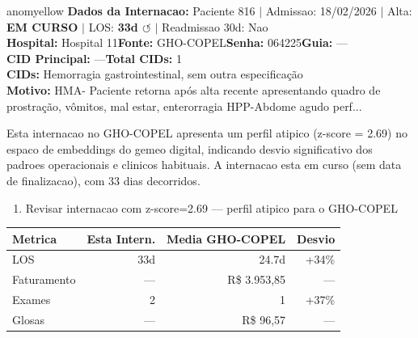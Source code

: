 \documentclass[a4paper,10pt]{article}
\begin{document}
\begin{anomalycard}[Internacao 698 | GHO-COPEL | MODERADO (z=2.69)]{anomyellow}
\textbf{Dados da Internacao:} Paciente 816 $\mid$ Admissao: 18/02/2026 $\mid$ Alta: \textcolor{anomorange}{\textbf{EM CURSO}} $\mid$ LOS: \textbf{33d \textcolor{anomorange}{$\circlearrowleft$}} $\mid$ Readmissao 30d: Nao\\
\textbf{Hospital:} Hospital 11\quad\textbf{Fonte:} GHO-COPEL\quad\textbf{Senha:} 064225\quad\textbf{Guia:} ---\\
\textbf{CID Principal:} {\small ---}\quad\textbf{Total CIDs:} 1\\

\textbf{CIDs:} {\scriptsize Hemorragia gastrointestinal, sem outra especificação}\\

\textbf{Motivo:} {\scriptsize HMA- Paciente retorna após alta recente apresentando quadro de prostração, vômitos, mal estar, enterorragia HPP-Abdome agudo perf...}\\

\vspace{2pt}\begin{tcolorbox}[colback=severityred!20,colframe=anomyellow,title={\textbf{Interpretacao de Negocio}},fonttitle=\bfseries\small,left=4pt,right=4pt,top=3pt,bottom=3pt]
{\small Esta internacao no GHO-COPEL apresenta um perfil atipico (z-score = 2.69) no espaco de embeddings do gemeo digital, indicando desvio significativo dos padroes operacionais e clinicos habituais. A internacao esta em curso (sem data de finalizacao), com 33 dias decorridos.}
\end{tcolorbox}
\begin{tcolorbox}[colback=severityyellow!30,colframe=anomorange,title={\textbf{Recomendacoes Especificas}},fonttitle=\bfseries\small,left=4pt,right=4pt,top=3pt,bottom=3pt]
\begin{enumerate}[nosep,leftmargin=16pt]
\item {\small Revisar internacao com z-score=2.69 --- perfil atipico para o GHO-COPEL}
\end{enumerate}
\end{tcolorbox}
\begin{center}\begin{tabular}{l r r r}\toprule\textbf{Metrica} & \textbf{Esta Intern.} & \textbf{Media GHO-COPEL} & \textbf{Desvio} \\\midrule
LOS & 33d & 24.7d & +34\% \\
Faturamento & --- & R\$ 3.953,85 & --- \\
Exames & 2 & 1 & +37\% \\
Glosas & --- & R\$ 96,57 & --- \\
\bottomrule\end{tabular}\end{center}


\end{anomalycard}
\end{document}
